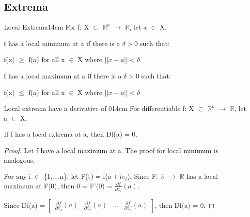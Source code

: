     \vspace{0.5cm}





\subsection{ Extrema }

    \begin{definition}{Local Extrema}{14cm}
        For f: X $\subset$ $\mathbb{R}^n$ $\rightarrow$ $\mathbb{R}$,
        let a $\in$ X.
        
        \hspace{0.5cm}
        f has a {\color{lblue} local minimum}
        at a if there is a $\delta > 0$ such that:

        \hspace{1cm}
        f(x) $\geq$ f(a) for all x $\in$ X where $||x-a|| < \delta$
        
        \hspace{0.5cm}
        f has a {\color{lblue} local maximum}
        at a if there is a $\delta > 0$ such that:

        \hspace{1cm}
        f(x) $\leq$ f(a) for all x $\in$ X where $||x-a|| < \delta$
    \end{definition}

    \vspace{0.5cm}



    \begin{wtheorem}{Local extrema have a derivative of 0}{14cm}
        For differentiable f: X $\subset$ $\mathbb{R}^n$ $\rightarrow$ $\mathbb{R}$,
        let a $\in$ X.

        If f has a local extrema at a, then Df(a) = 0.
    \end{wtheorem}

    \begin{proof}
        Let f have a local maximum at a. The proof for local minimum is
        analogous.

        For any i $\in$ \{1,...,n\}, let F(t) = f($a+te_i$).
        Since F: $\mathbb{R}$ $\rightarrow$ $\mathbb{R}$
        has a local maximum at F(0), then
        0 = F'(0) = $\frac{\partial f}{\partial x_i}(a)$.

        Since Df(a) =
        $
        \begin{bmatrix}
            \frac{\partial f}{\partial x_1}(a)
            & \frac{\partial f}{\partial x_2}(a)
            & ...
            & \frac{\partial f}{\partial x_n}(a)
        \end{bmatrix}
        $,
        then Df(a) = 0.
    \end{proof}

